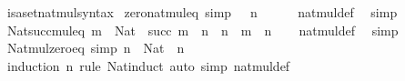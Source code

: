 \begin{isabellebody}
\isanewline
\isanewline
{}\isamarkupfalse%
\ isa{\isacharunderscore}{\kern0pt}set{\isacharunderscore}{\kern0pt}nat{\isacharunderscore}{\kern0pt}mul{\isacharunderscore}{\kern0pt}syntax\isanewline
\isanewline
{}\isamarkupfalse%
\ zero{\isacharunderscore}{\kern0pt}nat{\isacharunderscore}{\kern0pt}mul{\isacharunderscore}{\kern0pt}eq\ {\isacharbrackleft}{\kern0pt}simp{\isacharbrackright}{\kern0pt}{\isacharcolon}{\kern0pt}\ {\isachardoublequoteopen}{}\ {\isacharasterisk}{\kern0pt}\ n\ {\isacharequal}{\kern0pt}\ {}{\isachardoublequoteclose}\isanewline
%
\isadelimproof
\ \ %
\endisadelimproof
%
\isatagproof
{}\isamarkupfalse%
\ nat{\isacharunderscore}{\kern0pt}mul{\isacharunderscore}{\kern0pt}def\ \isamarkupfalse%
\ simp%
\endisatagproof
{\isafoldproof}%
%
\isadelimproof
\isanewline
%
\endisadelimproof
\isanewline
{}\isamarkupfalse%
\ Nat{\isacharunderscore}{\kern0pt}succ{\isacharunderscore}{\kern0pt}mul{\isacharunderscore}{\kern0pt}eq{\isacharcolon}{\kern0pt}\ {\isachardoublequoteopen}m\ {\isacharcolon}{\kern0pt}\ Nat\ {\isasymLongrightarrow}\ succ\ m\ {\isacharasterisk}{\kern0pt}\ n\ {\isacharequal}{\kern0pt}\ n\ {\isacharplus}{\kern0pt}\ {\isacharparenleft}{\kern0pt}m\ {\isacharasterisk}{\kern0pt}\ n{\isacharparenright}{\kern0pt}{\isachardoublequoteclose}\isanewline
%
\isadelimproof
\ \ %
\endisadelimproof
%
\isatagproof
{}\isamarkupfalse%
\ nat{\isacharunderscore}{\kern0pt}mul{\isacharunderscore}{\kern0pt}def\ \isamarkupfalse%
\ simp%
\endisatagproof
{\isafoldproof}%
%
\isadelimproof
\isanewline
%
\endisadelimproof
\isanewline
{}\isamarkupfalse%
\ Nat{\isacharunderscore}{\kern0pt}mul{\isacharunderscore}{\kern0pt}zero{\isacharunderscore}{\kern0pt}eq\ {\isacharbrackleft}{\kern0pt}simp{\isacharbrackright}{\kern0pt}{\isacharcolon}{\kern0pt}\ {\isachardoublequoteopen}n\ {\isacharcolon}{\kern0pt}\ Nat\ {\isasymLongrightarrow}\ n\ {\isacharasterisk}{\kern0pt}\ {}\ {\isacharequal}{\kern0pt}\ {}{\isachardoublequoteclose}\isanewline
%
\isadelimproof
\ \ %
\endisadelimproof
%
\isatagproof
{}\isamarkupfalse%
\ {\isacharparenleft}{\kern0pt}induction\ n\ rule{\isacharcolon}{\kern0pt}\ Nat{\isacharunderscore}{\kern0pt}induct{\isacharparenright}{\kern0pt}\ {\isacharparenleft}{\kern0pt}auto\ simp{\isacharcolon}{\kern0pt}\ nat{\isacharunderscore}{\kern0pt}mul{\isacharunderscore}{\kern0pt}def{\isacharparenright}{\kern0pt}%
\endisatagproof
{\isafoldproof}%
%
\isadelimproof
\isanewline

\end{isabellebody}
